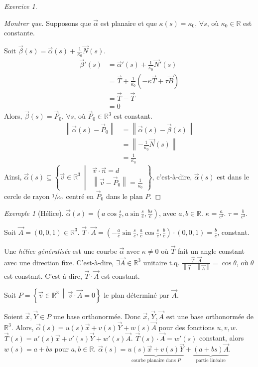 \documentclass{report}
\theoremstyle{definition}
\theoremstyle{remark}
\newtheorem*{exem}{Exemple}
\newtheorem*{exer}{Exercice}
\def\RR{\mathbb{R}}
\newcommand*{\norme}[1]{\left\|#1\right\|}
\begin{document}
\begin{exer}
\begin{proof}[Montrer que]
			Supposons que $\vec\alpha$ est planaire et que $\kappa(s)=\kappa_0$, $\forall s$, o\`u $\kappa_0 \in \RR$ est constante.

			Soit $\vec\beta(s) = \vec\alpha(s)+\frac{1}{\kappa_0}\vec N(s)$.
			\begin{align*}
				\vec\beta'(s)&= \vec\alpha'(s) + \frac{1}{\kappa_0} \vec N'(s)\\
				&= \vec T + \frac{1}{\kappa_0} \left( -\kappa\vec T + \tau\vec B \right)\\
				&= \vec T - \vec T\\
				&= 0
			\end{align*}
			Alors, $\vec\beta(s)=\vec P_0$, $\forall s$, o\`u $\vec P_0\in\RR^3$ est constant.
			\begin{align*}
				\norme{\vec\alpha(s) - \vec P_0}&= \norme{\vec\alpha(s) - \vec\beta(s)}\\
				&= \norme{-\frac{1}{\kappa_0} \vec N(s)}\\
				&= \frac{1}{\kappa_0}
			\end{align*}
			Ainsi, $\vec\alpha(s) \subseteq \left\{ \vec v\in\RR^3  ~\middle|~ \begin{array}{l}
				\vec v \cdot \vec n=d\\
				\norme{\vec v-\vec P_0}=\frac{1}{\kappa_0}
			\end{array}\right\}$, c'est-\`a-dire, $\vec\alpha(s)$ est dans le cercle de rayon $\sfrac{1}{\kappa_0}$ centr\'e en $\vec P_0$ dans le plan $P$.
		\end{proof}
	\end{exer}

	\begin{exem}[H\'elice]
		$\vec\alpha(s) = \left( a\cos\frac{s}{c}, a\sin\frac{s}{c}, \frac{bs}{c} \right)$, avec $a,b\in\RR$. $\kappa=\frac{a}{c^2}$. $\tau=\frac{b}{c^2}$.

		Soit $\vec A=(0,0,1)\in\RR^3$. $\vec T \cdot \vec A = \left( -\frac{a}{c}\sin\frac{s}{c}, \frac{a}{c}\cos\frac{s}{c}, \frac{b}{c} \right) \cdot (0,0,1) = \frac{b}{c}$, constant.

		Une \emph{h\'elice g\'en\'eralis\'ee} est une courbe $\vec\alpha$ avec $\kappa\neq0$ o\`u $\vec T$ fait un angle constant avec une direction fixe. C'est-\`a-dire, $\exists\vec A\in\RR^3$ unitaire t.q. $\frac{\vec T \cdot \vec A}{\norme{\vec T} \norme{\vec A}}=\cos\theta$, o\`u $\theta$ est constant. C'est-\`a-dire, $\vec T \cdot \vec A$ est constant.

		Soit $P = \left\{ \vec v\in\RR^3 ~\middle|~ \vec v \cdot \vec A=0 \right\}$ le plan d\'etermin\'e par $\vec A$.

		Soient $\vec x, \vec Y \in P$ une base orthonorm\'ee. Donc $\vec x, \vec Y, \vec A$ est une base orthonorm\'ee de $\RR^3$. Alors, $\vec\alpha(s) = u(s)\vec x+v(s)\vec Y+w(s)\vec A$ pour des fonctions $u,v,w$. $\vec T(s) = u'(s)\vec x+v'(s)\vec Y+w'(s)\vec A$. $\vec T(s) \cdot \vec A=w'(s)$ constant, alors $w(s)=a+bs$ pour $a,b\in\RR$. $\vec\alpha(s) = \underbrace{u(s)\vec x+v(s)\vec Y}_{\text{courbe planaire dans $P$}} + \underbrace{(a+bs)\vec A}_{\text{partie lin\'eaire}}$.
	\end{exem}
\end{document}
